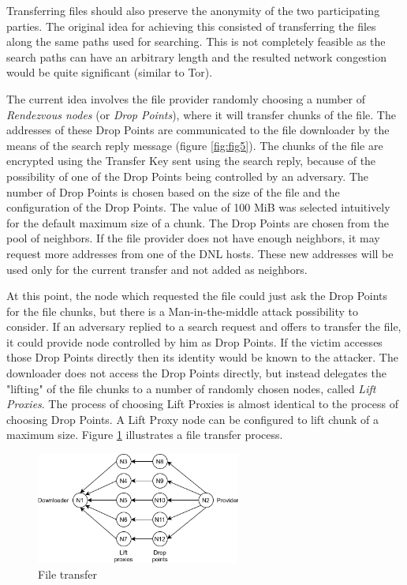 Transferring files should also preserve the anonymity of the two participating 
parties. The original idea for achieving this consisted of transferring the 
files along the same paths used for searching. This is not completely feasible 
as the search paths can have an arbitrary length and the resulted network 
congestion would be quite significant (similar to Tor).

The current idea involves the file provider randomly choosing a number of 
\textit{Rendezvous nodes} (or \textit{Drop Points}), where it will transfer 
chunks of the file. The addresses of these Drop Points are communicated to the 
file downloader by the means of the search reply message (figure 
\ref{fig:fig5}). The chunks of the file are encrypted using the Transfer Key 
sent using the search reply, because of the possibility of one of the Drop 
Points being controlled by an adversary. The number of Drop Points is chosen 
based on the size of the file and the configuration of the Drop Points. The 
value of 100 MiB was selected intuitively for the default maximum size of a 
chunk. The Drop Points are chosen from the pool of neighbors. If the file 
provider does not have enough neighbors, it may request more addresses from one 
of the DNL hosts. These new addresses will be used only for the current 
transfer and not added as neighbors.

At this point, the node which requested the file could just ask the Drop Points 
for the file chunks, but there is a Man-in-the-middle attack possibility to 
consider. If an adversary replied to a search request and offers to transfer 
the file, it could provide node controlled by him as Drop Points. If the victim 
accesses those Drop Points directly then its identity would be known to the 
attacker. The downloader does not access the Drop Points directly, but instead 
delegates the "lifting" of the file chunks to a number of randomly chosen 
nodes, called \textit{Lift Proxies}. The process of choosing Lift Proxies is 
almost identical to the process of choosing Drop Points. A Lift Proxy node can 
be configured to lift chunk of a maximum size. Figure \ref{fig:fig7} 
illustrates a file transfer process.

\begin{figure}
    \centering
    \includegraphics[width=0.6\textwidth]{figures/fig7}
    \caption{File transfer}
    \label{fig:fig7}
\end{figure}
